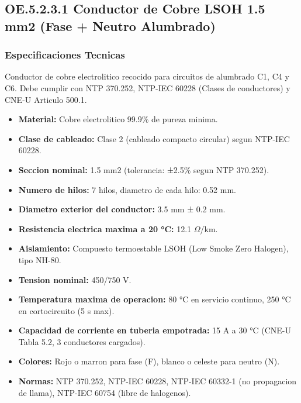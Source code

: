 \subsection{OE.5.2.3.1 Conductor de Cobre LSOH 1.5 mm2 (Fase + Neutro Alumbrado)}

\subsubsection{Especificaciones Tecnicas}

Conductor de cobre electrolitico recocido para circuitos de alumbrado C1, C4 y C6. Debe cumplir con NTP 370.252, NTP-IEC 60228 (Clases de conductores) y CNE-U Articulo 500.1.

\begin{itemize}[nosep]
  \item \textbf{Material:} Cobre electrolitico 99.9\% de pureza minima.
  \item \textbf{Clase de cableado:} Clase 2 (cableado compacto circular) segun NTP-IEC 60228.
  \item \textbf{Seccion nominal:} 1.5 mm2 (tolerancia: ±2.5\% segun NTP 370.252).
  \item \textbf{Numero de hilos:} 7 hilos, diametro de cada hilo: 0.52 mm.
  \item \textbf{Diametro exterior del conductor:} 3.5 mm ± 0.2 mm.
  \item \textbf{Resistencia electrica maxima a 20 °C:} 12.1 $\Omega$/km.
  \item \textbf{Aislamiento:} Compuesto termoestable LSOH (Low Smoke Zero Halogen), tipo NH-80.
  \item \textbf{Tension nominal:} 450/750 V.
  \item \textbf{Temperatura maxima de operacion:} 80 °C en servicio continuo, 250 °C en cortocircuito (5 s max).
  \item \textbf{Capacidad de corriente en tuberia empotrada:} 15 A a 30 °C (CNE-U Tabla 5.2, 3 conductores cargados).
  \item \textbf{Colores:} Rojo o marron para fase (F), blanco o celeste para neutro (N).
  \item \textbf{Normas:} NTP 370.252, NTP-IEC 60228, NTP-IEC 60332-1 (no propagacion de llama), NTP-IEC 60754 (libre de halogenos).
\end{itemize}

